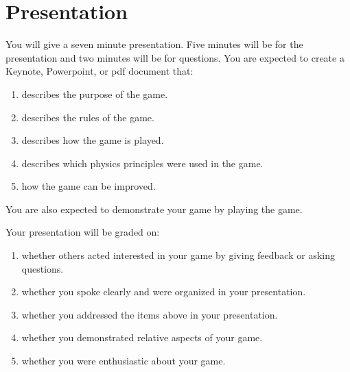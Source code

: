 \section*{Presentation}

You will give a seven minute presentation. Five minutes will be for the presentation and two minutes will be for questions. You are expected to create a Keynote, Powerpoint, or pdf document that:

\begin{enumerate}
	\item describes the purpose of the game.
	\item describes the rules of the game.
	\item describes how the game is played.
	\item describes which physics principles were used in the game.
	\item how the game can be improved.
\end{enumerate}

You are also expected to demonstrate your game by playing the game.

Your presentation will be graded on:

\begin{enumerate}
	\item whether others acted interested in your game by giving feedback or asking questions.
	\item whether you spoke clearly and were organized in your presentation.
	\item whether you addressed the items above in your presentation.
	\item whether you demonstrated relative aspects of your game.
	\item whether you were enthusiastic about your game.
\end{enumerate}

